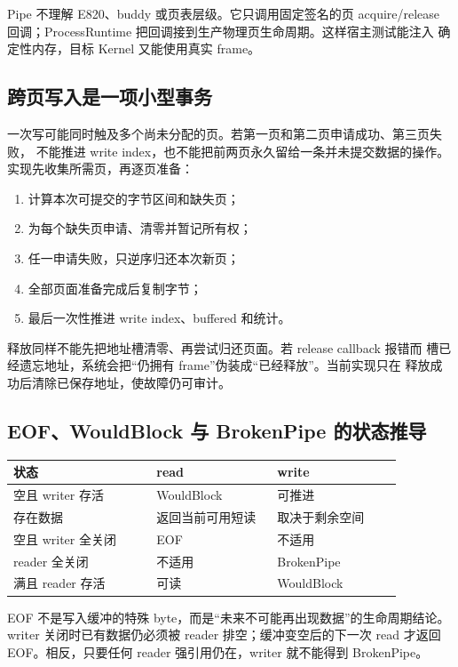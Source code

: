 Pipe 不理解 E820、buddy 或页表层级。它只调用固定签名的页 acquire/release
回调；ProcessRuntime 把回调接到生产物理页生命周期。这样宿主测试能注入
确定性内存，目标 Kernel 又能使用真实 frame。

\subsection{跨页写入是一项小型事务}

一次写可能同时触及多个尚未分配的页。若第一页和第二页申请成功、第三页失败，
不能推进 write index，也不能把前两页永久留给一条并未提交数据的操作。
实现先收集所需页，再逐页准备：

\begin{enumerate}[label=\arabic*.]
  \item 计算本次可提交的字节区间和缺失页；
  \item 为每个缺失页申请、清零并暂记所有权；
  \item 任一申请失败，只逆序归还本次新页；
  \item 全部页面准备完成后复制字节；
  \item 最后一次性推进 write index、buffered 和统计。
\end{enumerate}

释放同样不能先把地址槽清零、再尝试归还页面。若 release callback 报错而
槽已经遗忘地址，系统会把“仍拥有 frame”伪装成“已经释放”。当前实现只在
释放成功后清除已保存地址，使故障仍可审计。

\subsection{EOF、WouldBlock 与 BrokenPipe 的状态推导}

\begin{center}
\begin{tabular}{L{0.32\linewidth}L{0.27\linewidth}L{0.28\linewidth}}
\toprule
状态 & read & write \\
\midrule
空且 writer 存活 & WouldBlock & 可推进 \\
存在数据 & 返回当前可用短读 & 取决于剩余空间 \\
空且 writer 全关闭 & EOF & 不适用 \\
reader 全关闭 & 不适用 & BrokenPipe \\
满且 reader 存活 & 可读 & WouldBlock \\
\bottomrule
\end{tabular}
\end{center}

EOF 不是写入缓冲的特殊 byte，而是“未来不可能再出现数据”的生命周期结论。
writer 关闭时已有数据仍必须被 reader 排空；缓冲变空后的下一次 read 才返回
EOF。相反，只要任何 reader 强引用仍在，writer 就不能得到 BrokenPipe。

